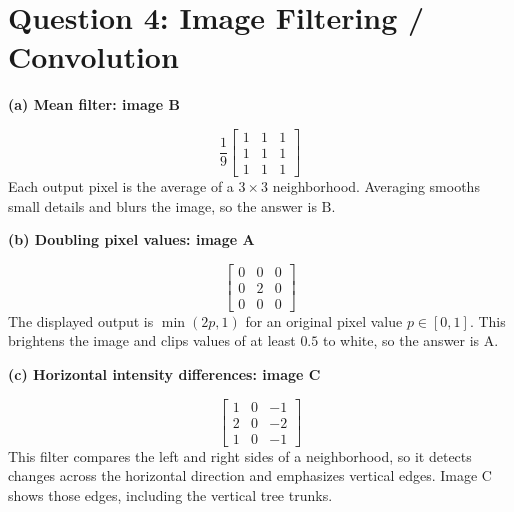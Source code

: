\documentclass[11pt]{article}
\newcommand{\parttitle}[1]{\par\textbf{#1}\par}
\begin{document}
\begin{center}
\end{center}

\newpage
\section*{Question 4: Image Filtering / Convolution}
\parttitle{(a) Mean filter: image B}
\[
\frac19\begin{bmatrix}1&1&1\\1&1&1\\1&1&1\end{bmatrix}
\]
Each output pixel is the average of a $3\times3$ neighborhood. Averaging smooths small details and blurs the image, so the answer is $\boxed{\text{B}}$.

\parttitle{(b) Doubling pixel values: image A}
\[
\begin{bmatrix}0&0&0\\0&2&0\\0&0&0\end{bmatrix}
\]
The displayed output is $\min(2p,1)$ for an original pixel value $p\in[0,1]$.
This brightens the image and clips values of at least $0.5$ to white, so the answer is $\boxed{\text{A}}$.

\parttitle{(c) Horizontal intensity differences: image C}
\[
\begin{bmatrix}1&0&-1\\2&0&-2\\1&0&-1\end{bmatrix}
\]
This filter compares the left and right sides of a neighborhood, so it detects changes across the horizontal direction and emphasizes vertical edges. Image $\boxed{\text{C}}$ shows those edges, including the vertical tree trunks.
\end{document}
